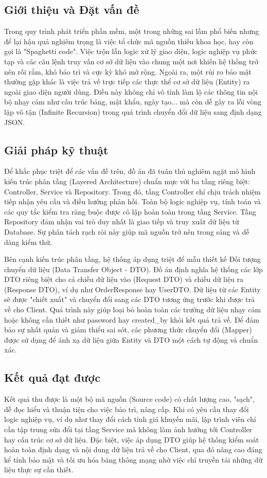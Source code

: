 \documentclass[../20232006p.tex]{subfiles}
\begin{document}
\subsection{Giới thiệu và Đặt vấn đề}
Trong quy trình phát triển phần mềm, một trong những sai lầm phổ biến nhưng để lại hậu quả nghiêm trọng là việc tổ chức mã nguồn thiếu khoa học, hay còn gọi là "Spaghetti code". Việc trộn lẫn logic xử lý giao diện, logic nghiệp vụ phức tạp và các câu lệnh truy vấn cơ sở dữ liệu vào chung một nơi khiến hệ thống trở nên rối rắm, khó bảo trì và cực kỳ khó mở rộng. Ngoài ra, một rủi ro bảo mật thường gặp khác là việc trả về trực tiếp các thực thể cơ sở dữ liệu (Entity) ra ngoài giao diện người dùng. Điều này không chỉ vô tình làm lộ các thông tin nội bộ nhạy cảm như cấu trúc bảng, mật khẩu, ngày tạo... mà còn dễ gây ra lỗi vòng lặp vô tận (Infinite Recursion) trong quá trình chuyển đổi dữ liệu sang định dạng JSON.

\subsection{Giải pháp kỹ thuật}
Để khắc phục triệt để các vấn đề trên, đồ án đã tuân thủ nghiêm ngặt mô hình kiến trúc phân tầng (Layered Architecture) chuẩn mực với ba tầng riêng biệt: Controller, Service và Repository. Trong đó, tầng Controller chỉ chịu trách nhiệm tiếp nhận yêu cầu và điều hướng phản hồi. Toàn bộ logic nghiệp vụ, tính toán và các quy tắc kiểm tra ràng buộc được cô lập hoàn toàn trong tầng Service. Tầng Repository đảm nhận vai trò duy nhất là giao tiếp và truy xuất dữ liệu từ Database. Sự phân tách rạch ròi này giúp mã nguồn trở nên trong sáng và dễ dàng kiểm thử.

Bên cạnh kiến trúc phân tầng, hệ thống áp dụng triệt để mẫu thiết kế Đối tượng chuyển dữ liệu (Data Transfer Object - DTO). Đồ án định nghĩa hệ thống các lớp DTO riêng biệt cho cả chiều dữ liệu vào (Request DTO) và chiều dữ liệu ra (Response DTO), ví dụ như OrderResponse hay UserDTO. Dữ liệu từ các Entity sẽ được "chiết xuất" và chuyển đổi sang các DTO tương ứng trước khi được trả về cho Client. Quá trình này giúp loại bỏ hoàn toàn các trường dữ liệu nhạy cảm hoặc không cần thiết như password hay created\_by khỏi kết quả trả về. Để đảm bảo sự nhất quán và giảm thiểu sai sót, các phương thức chuyển đổi (Mapper) được sử dụng để ánh xạ dữ liệu giữa Entity và DTO một cách tự động và chuẩn xác.

\subsection{Kết quả đạt được}
Kết quả thu được là một bộ mã nguồn (Source code) có chất lượng cao, "sạch", dễ đọc hiểu và thuận tiện cho việc bảo trì, nâng cấp. Khi có yêu cầu thay đổi logic nghiệp vụ, ví dụ như thay đổi cách tính giá khuyến mãi, lập trình viên chỉ cần tập trung sửa đổi tại tầng Service mà không làm ảnh hưởng tới Controller hay cấu trúc cơ sở dữ liệu. Đặc biệt, việc áp dụng DTO giúp hệ thống kiểm soát hoàn toàn định dạng và nội dung dữ liệu trả về cho Client, qua đó nâng cao đáng kể tính bảo mật và tối ưu hóa băng thông mạng nhờ việc chỉ truyền tải những dữ liệu thực sự cần thiết.
\end{document}
